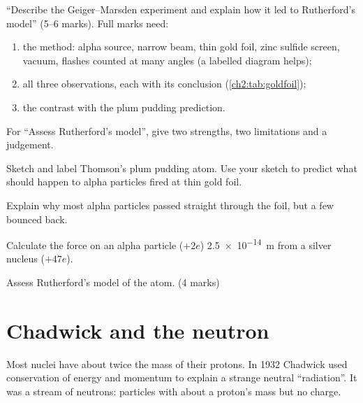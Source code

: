 \begin{examtip}
``Describe the Geiger--Marsden experiment and explain how it led to Rutherford's
model'' (5--6 marks). Full marks need:
\begin{enumerate}
  \item the method: alpha source, narrow beam, thin gold foil, zinc sulfide
        screen, vacuum, flashes counted at many angles (a labelled diagram helps);
  \item all three observations, each with its conclusion (\cref{ch2:tab:goldfoil});
  \item the contrast with the plum pudding prediction.
\end{enumerate}
For ``Assess Rutherford's model'', give two strengths, two limitations and a judgement.
\end{examtip}

\begin{quickcheck}
  \item Sketch and label Thomson's plum pudding atom. Use your sketch to predict
        what should happen to alpha particles fired at thin gold foil.
  \item Explain why most alpha particles passed straight through the foil, but a
        few bounced back.
  \item Calculate the force on an alpha particle ($+2e$) \qty{2.5e-14}{m} from a
        silver nucleus ($+47e$).
  \item Assess Rutherford's model of the atom. (4 marks)
\end{quickcheck}

\section{Chadwick and the neutron}\label{ch2:sec:neutron}

\begin{bigidea}
Most nuclei have about twice the mass of their protons. In 1932 Chadwick
used conservation of energy and momentum to explain a strange neutral
``radiation''. It was a stream of neutrons: particles with about a proton's mass
but no charge.
\end{bigidea}

\begin{keywords}
\end{keywords}

